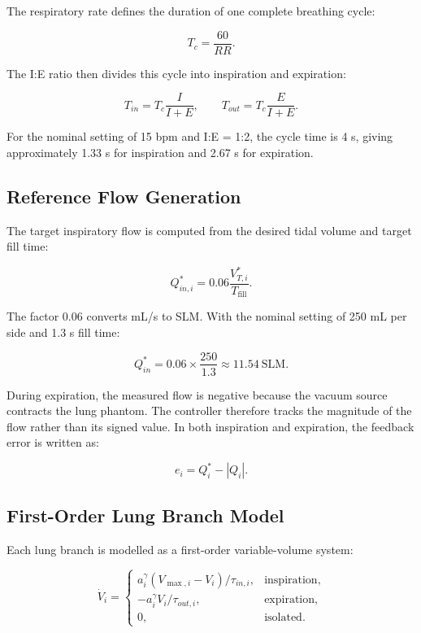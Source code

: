 \documentclass[11pt,a4paper]{article}
\begin{document}
The respiratory rate defines the duration of one complete breathing cycle:

\begin{equation}
  T_c=\frac{60}{RR}.
\end{equation}

The I:E ratio then divides this cycle into inspiration and expiration:

\begin{equation}
  T_{in}=T_c\frac{I}{I+E},
  \qquad
  T_{out}=T_c\frac{E}{I+E}.
\end{equation}

For the nominal setting of 15 bpm and I:E = 1:2, the cycle time is 4 s, giving approximately 1.33 s for inspiration and 2.67 s for expiration.

\subsection{Reference Flow Generation}

The target inspiratory flow is computed from the desired tidal volume and target fill time:

\begin{equation}
  Q^*_{in,i}
  =
  0.06
  \frac{V^*_{T,i}}{T_{\mathrm{fill}}}.
\end{equation}

The factor 0.06 converts mL/s to SLM. With the nominal setting of 250 mL per side and 1.3 s fill time:

\begin{equation}
  Q^*_{in}
  =
  0.06 \times \frac{250}{1.3}
  \approx
  11.54~\mathrm{SLM}.
\end{equation}

During expiration, the measured flow is negative because the vacuum source contracts the lung phantom. The controller therefore tracks the magnitude of the flow rather than its signed value. In both inspiration and expiration, the feedback error is written as:

\begin{equation}
  e_i=Q^*_i-|Q_i|.
\end{equation}

\subsection{First-Order Lung Branch Model}

Each lung branch is modelled as a first-order variable-volume system:

\begin{equation}
\dot V_i =
\begin{cases}
a_i^\gamma (V_{\max,i}-V_i)/\tau_{in,i}, & \text{inspiration},\\
-a_i^\gamma V_i/\tau_{out,i}, & \text{expiration},\\
0, & \text{isolated}.
\end{cases}
\end{equation}
\end{document}

